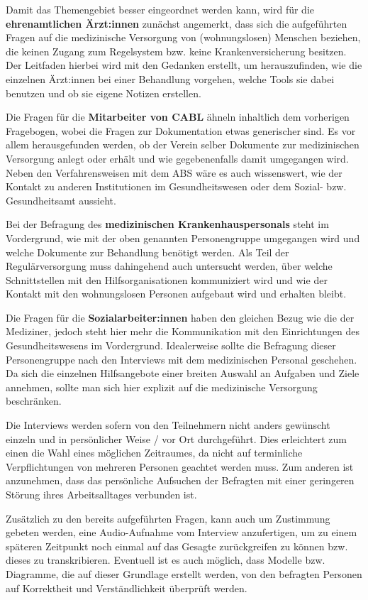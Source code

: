 Damit das Themengebiet besser eingeordnet werden kann, wird für die \textbf{ehrenamtlichen Ärzt:innen} zunächst angemerkt, dass sich die aufgeführten Fragen auf die medizinische Versorgung von (wohnungslosen) Menschen beziehen, die keinen Zugang zum Regelsystem bzw. keine Krankenversicherung besitzen. Der Leitfaden hierbei wird mit den Gedanken erstellt, um herauszufinden, wie die einzelnen Ärzt:innen bei einer Behandlung vorgehen, welche Tools sie dabei benutzen und ob sie eigene Notizen erstellen.

Die Fragen für die \textbf{Mitarbeiter von CABL} ähneln inhaltlich dem vorherigen Fragebogen, wobei die Fragen zur Dokumentation etwas generischer sind. Es vor allem herausgefunden werden, ob der Verein selber Dokumente zur medizinischen Versorgung anlegt oder erhält und wie gegebenenfalls damit umgegangen wird. Neben den Verfahrensweisen mit dem ABS wäre es auch wissenswert, wie der Kontakt zu anderen Institutionen im Gesundheitswesen oder dem Sozial- bzw. Gesundheitsamt aussieht.

Bei der Befragung des \textbf{medizinischen Krankenhauspersonals} steht im Vordergrund, wie mit der oben genannten Personengruppe umgegangen wird und welche Dokumente zur Behandlung benötigt werden. Als Teil der Regulärversorgung muss dahingehend auch untersucht werden, über welche Schnittstellen mit den Hilfsorganisationen kommuniziert wird und wie der Kontakt mit den wohnungslosen Personen aufgebaut wird und erhalten bleibt.

Die Fragen für die \textbf{Sozialarbeiter:innen} haben den gleichen Bezug wie die der Mediziner, jedoch steht hier mehr die Kommunikation mit den Einrichtungen des Gesundheitswesens im Vordergrund. Idealerweise sollte die Befragung dieser Personengruppe nach den Interviews mit dem medizinischen Personal geschehen. Da sich die einzelnen Hilfsangebote einer breiten Auswahl an Aufgaben und Ziele annehmen, sollte man sich hier explizit auf die medizinische Versorgung beschränken.

Die Interviews werden sofern von den Teilnehmern nicht anders gewünscht einzeln und in persönlicher Weise / vor Ort durchgeführt. Dies erleichtert zum einen die Wahl eines möglichen Zeitraumes, da nicht auf terminliche Verpflichtungen von mehreren Personen geachtet werden muss. Zum anderen ist anzunehmen, dass das persönliche Aufsuchen der Befragten mit einer geringeren Störung ihres Arbeitsalltages verbunden ist.

Zusätzlich zu den bereits aufgeführten Fragen, kann auch um Zustimmung gebeten werden, eine Audio-Aufnahme vom Interview anzufertigen, um zu einem späteren Zeitpunkt noch einmal auf das Gesagte zurückgreifen zu können bzw. dieses zu transkribieren. Eventuell ist es auch möglich, dass Modelle bzw. Diagramme, die auf dieser Grundlage erstellt werden, von den befragten Personen auf Korrektheit und Verständlichkeit überprüft werden.


